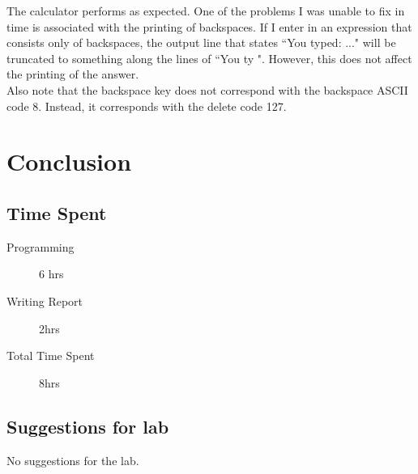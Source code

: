 \documentclass[11pt]{article}
\begin{document}
The calculator performs as expected. One of the problems I was unable to fix in time is associated with the printing of backspaces. If I enter in an expression that consists only of backspaces, the output line that states ``You typed: ..." will be truncated to something along the lines of ``You ty ". However, this does not affect the printing of the answer. \\

Also note that the backspace key does not correspond with the backspace ASCII code 8. Instead, it corresponds with the delete code 127.


\section{Conclusion}

\subsection{Time Spent}

\begin{description}
	\item[Programming] 6 hrs
 	\item[Writing Report] 2hrs
	\item[Total Time Spent] 8hrs
\end{description}

\subsection{Suggestions for lab}

No suggestions for the lab.
\end{document}
